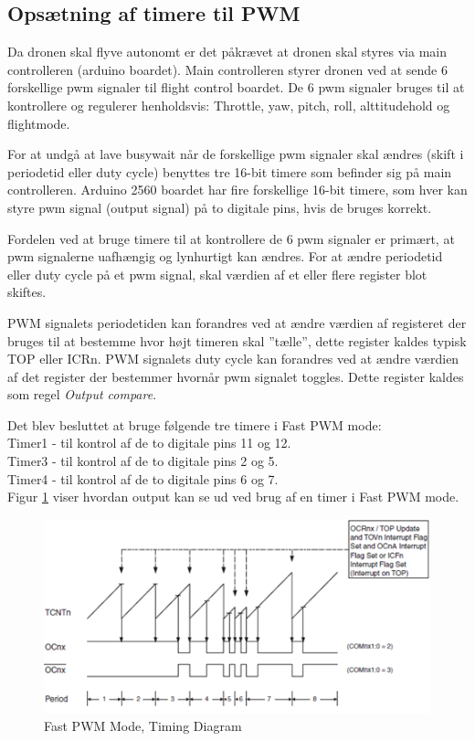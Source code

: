 \subsection{Opsætning af timere til PWM}

Da dronen skal flyve autonomt er det påkrævet at dronen skal styres via main controlleren (arduino boardet). Main controlleren styrer dronen ved at sende 6 forskellige pwm signaler til flight control boardet. De 6 pwm signaler bruges til at kontrollere og regulerer henholdsvis: Throttle, yaw, pitch, roll, alttitudehold og flightmode.

For at undgå at lave busywait når de forskellige pwm signaler skal ændres (skift i periodetid eller duty cycle) benyttes tre 16-bit timere som befinder sig på main controlleren. Arduino 2560 boardet har fire forskellige 16-bit timere, som hver kan styre pwm signal (output signal) på to digitale pins, hvis de  bruges korrekt. 

Fordelen ved at bruge timere til at kontrollere de 6 pwm signaler er primært, at pwm signalerne uafhængig og lynhurtigt kan ændres. For at ændre periodetid eller duty cycle på et pwm signal, skal værdien af et eller flere register blot skiftes. 

PWM signalets periodetiden kan forandres ved at ændre værdien af registeret der bruges til at bestemme hvor højt timeren skal ”tælle”, dette register kaldes typisk TOP eller ICRn. 
PWM signalets duty cycle kan forandres ved at ændre værdien af det register der bestemmer hvornår pwm signalet toggles. Dette register kaldes som regel \textit{Output compare}.

Det blev besluttet at bruge følgende tre timere i Fast PWM mode: \\
Timer1 - til kontrol af de to digitale pins 11 og 12.\\
Timer3 -  til kontrol af de to digitale pins 2 og 5.\\
Timer4 - til kontrol af de to digitale pins 6 og 7. \\

Figur \ref{fig:Timing_diagram} viser hvordan output kan se ud ved brug af en timer i Fast PWM mode.  

\begin{figure}[H]
	\centering
	\includegraphics[width=1.\textwidth]{Billeder/Timer/0_timing_diagram.png}
	\caption{Fast PWM Mode, Timing Diagram}
	\label{fig:Timing_diagram}
\end{figure}

